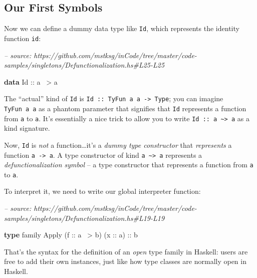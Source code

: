 \documentclass[]{article}
\newenvironment{Shaded}{}{}
\newcommand{\CommentTok}[1]{\textcolor[rgb]{0.38,0.63,0.69}{\textit{#1}}}
\newcommand{\DataTypeTok}[1]{\textcolor[rgb]{0.56,0.13,0.00}{#1}}
\newcommand{\FunctionTok}[1]{\textcolor[rgb]{0.02,0.16,0.49}{#1}}
\newcommand{\KeywordTok}[1]{\textcolor[rgb]{0.00,0.44,0.13}{\textbf{#1}}}
\newcommand{\NormalTok}[1]{#1}
\newcommand{\OtherTok}[1]{\textcolor[rgb]{0.00,0.44,0.13}{#1}}
\begin{document}
\hypertarget{our-first-symbols}{%
\subsection{Our First Symbols}\label{our-first-symbols}}

Now we can define a dummy data type like \texttt{Id}, which represents the
identity function \texttt{id}:

\begin{Shaded}
\begin{Highlighting}[]
\CommentTok{-- source: https://github.com/mstksg/inCode/tree/master/code-samples/singletons/Defunctionalization.hs#L25-L25}

\KeywordTok{data} \DataTypeTok{Id}\OtherTok{ ::}\NormalTok{ a }\FunctionTok{~>}\NormalTok{ a}
\end{Highlighting}
\end{Shaded}

The ``actual'' kind of \texttt{Id} is
\texttt{Id\ ::\ TyFun\ a\ a\ -\textgreater{}\ Type}; you can imagine
\texttt{TyFun\ a\ a} as a phantom parameter that signifies that \texttt{Id}
represents a function from \texttt{a} to \texttt{a}. It's essentially a nice
trick to allow you to write
\texttt{Id\ ::\ a\ \textasciitilde{}\textgreater{}\ a} as a kind signature.

Now, \texttt{Id} is \emph{not} a function\ldots{}it's a \emph{dummy type
constructor} that \emph{represents} a function \texttt{a\ -\textgreater{}\ a}. A
type constructor of kind \texttt{a\ \textasciitilde{}\textgreater{}\ a}
represents a \emph{defunctionalization symbol} -- a type constructor that
represents a function from \texttt{a} to \texttt{a}.

To interpret it, we need to write our global interpreter function:

\begin{Shaded}
\begin{Highlighting}[]
\CommentTok{-- source: https://github.com/mstksg/inCode/tree/master/code-samples/singletons/Defunctionalization.hs#L19-L19}

\KeywordTok{type}\NormalTok{ family }\DataTypeTok{Apply}\NormalTok{ (}\OtherTok{f ::}\NormalTok{ a }\FunctionTok{~>}\NormalTok{ b) (}\OtherTok{x ::}\NormalTok{ a)}\OtherTok{ ::}\NormalTok{ b}
\end{Highlighting}
\end{Shaded}

That's the syntax for the definition of an \emph{open} type family in Haskell:
users are free to add their own instances, just like how type classes are
normally open in Haskell.
\end{document}
